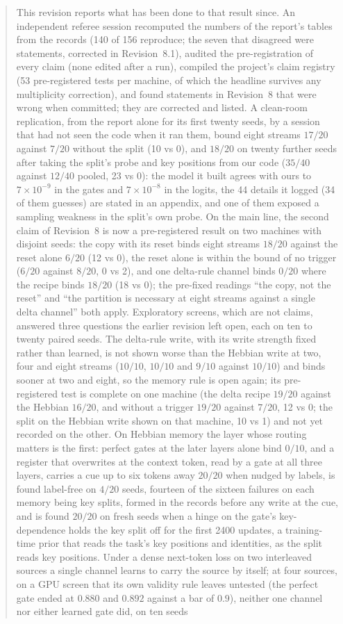 \documentclass[11pt]{article}
\begin{document}
\begin{abstract}
This revision reports what has been done to that result since. An independent referee session recomputed the numbers of the report's tables from the records (140 of 156 reproduce; the seven that disagreed were statements, corrected in Revision~8.1), audited the pre-registration of every claim (none edited after a run), compiled the project's claim registry (53 pre-registered tests per machine, of which the headline survives any multiplicity correction), and found statements in Revision~8 that were wrong when committed; they are corrected and listed. A clean-room replication, from the report alone for its first twenty seeds, by a session that had not seen the code when it ran them, bound eight streams $17/20$ against $7/20$ without the split (10 vs 0), and $18/20$ on twenty further seeds after taking the split's probe and key positions from our code ($35/40$ against $12/40$ pooled, 23 vs 0): the model it built agrees with ours to $7\times10^{-9}$ in the gates and $7\times10^{-8}$ in the logits, the 44 details it logged (34 of them guesses) are stated in an appendix, and one of them exposed a sampling weakness in the split's own probe. On the main line, the second claim of Revision~8 is now a pre-registered result on two machines with disjoint seeds: the copy with its reset binds eight streams $18/20$ against the reset alone $6/20$ (12 vs 0), the reset alone is within the bound of no trigger ($6/20$ against $8/20$, 0 vs 2), and one delta-rule channel binds $0/20$ where the recipe binds $18/20$ (18 vs 0); the pre-fixed readings ``the copy, not the reset'' and ``the partition is necessary at eight streams against a single delta channel'' both apply. Exploratory screens, which are not claims, answered three questions the earlier revision left open, each on ten to twenty paired seeds. The delta-rule write, with its write strength fixed rather than learned, is not shown worse than the Hebbian write at two, four and eight streams ($10/10$, $10/10$ and $9/10$ against $10/10$) and binds sooner at two and eight, so the memory rule is open again; its pre-registered test is complete on one machine (the delta recipe $19/20$ against the Hebbian $16/20$, and without a trigger $19/20$ against $7/20$, 12 vs 0; the split on the Hebbian write shown on that machine, 10 vs 1) and not yet recorded on the other. On Hebbian memory the layer whose routing matters is the first: perfect gates at the later layers alone bind $0/10$, and a register that overwrites at the context token, read by a gate at all three layers, carries a cue up to six tokens away $20/20$ when nudged by labels, is found label-free on $4/20$ seeds, fourteen of the sixteen failures on each memory being key splits, formed in the records before any write at the cue, and is found $20/20$ on fresh seeds when a hinge on the gate's key-dependence holds the key split off for the first 2400 updates, a training-time prior that reads the task's key positions and identities, as the split reads key positions. Under a dense next-token loss on two interleaved sources a single channel learns to carry the source by itself; at four sources, on a GPU screen that its own validity rule leaves untested (the perfect gate ended at $0.880$ and $0.892$ against a bar of $0.9$), neither one channel nor either learned gate did, on ten seeds 
\end{abstract}
\end{document}
